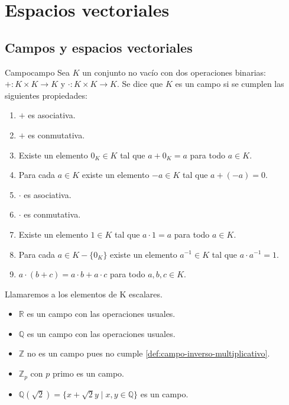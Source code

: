 \chapter{Espacios vectoriales}

\section{Campos y espacios vectoriales}
\begin{definition}{Campo}{campo} 
    Sea $K$ un conjunto no vacío con dos operaciones binarias:\\ $+:K\times K\rightarrow K$ y $\cdot:K\times K\rightarrow K$. Se dice que $K$ es un campo si se cumplen las siguientes propiedades:
    \begin{enumerate}
        \item $+$ es asociativa. \label{def:campo-asociativa-aditiva}
        \item $+$ es conmutativa. \label{def:campo-conmutativa-aditiva}
        \item Existe un elemento $0_K\in K$ tal que $a+0_K=a$ para todo $a\in K$. \label{def:campo-neutro-aditivo}
        \item Para cada $a\in K$ existe un elemento $-a\in K$ tal que $a+(-a)=0$. \label{def:campo-inverso-aditivo}
        \item $\cdot$ es asociativa. \label{def:campo-asociativa-multiplicativa}
        \item $\cdot$ es conmutativa. \label{def:campo-conmutativa-multiplicativa}
        \item Existe un elemento $1\in K$ tal que $a\cdot 1=a$ para todo $a\in K$. \label{def:campo-neutro-multiplicativo}
        \item Para cada $a\in K - \{0_K\}$ existe un elemento $a^{-1}\in K$ tal que $a\cdot a^{-1}=1$. \label{def:campo-inverso-multiplicativo}
        \item $a \cdot (b+c)=a\cdot b + a\cdot c$ para todo $a,b,c\in K$. \label{def:campo-distributiva-izquierda}
    \end{enumerate}
    Llamaremos a los elementos de K escalares.
\end{definition}


\begin{example}{}{}
\begin{itemize}
    \item $\mathbb{R}$ es un campo con las operaciones usuales.
    \item $\mathbb{Q}$ es un campo con las operaciones usuales.
    \item $\mathbb{Z}$ no es un campo pues no cumple \ref{def:campo-inverso-multiplicativo}.
    \item $\mathbb{Z}_p$ con $p$ primo es un campo.
    \item $\mathbb{Q}(\sqrt{2}) = \{x + \sqrt{2}y \mid x,y \in \mathbb{Q}\}$ es un campo.
    

\end{itemize}

\end{example}

